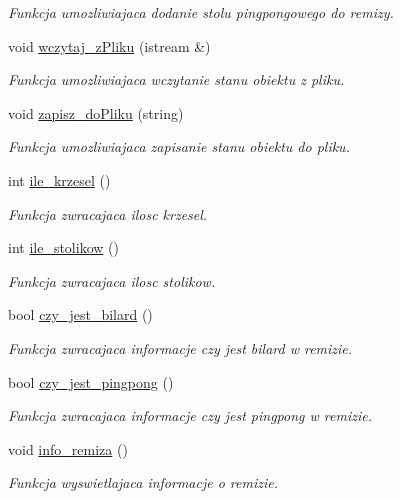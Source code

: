 \begin{DoxyCompactItemize}
\begin{DoxyCompactList}\small\item\em Funkcja umozliwiajaca dodanie stolu pingpongowego do remizy. \end{DoxyCompactList}\item 
\hypertarget{class_remiza_a783c6296060a050b61935787794d027c}{}void \hyperlink{class_remiza_a783c6296060a050b61935787794d027c}{wczytaj\+\_\+z\+Pliku} (istream \&)\label{class_remiza_a783c6296060a050b61935787794d027c}

\begin{DoxyCompactList}\small\item\em Funkcja umozliwiajaca wczytanie stanu obiektu z pliku. \end{DoxyCompactList}\item 
\hypertarget{class_remiza_a4c2563c5bde280b2232a555f45f79b3b}{}void \hyperlink{class_remiza_a4c2563c5bde280b2232a555f45f79b3b}{zapisz\+\_\+do\+Pliku} (string)\label{class_remiza_a4c2563c5bde280b2232a555f45f79b3b}

\begin{DoxyCompactList}\small\item\em Funkcja umozliwiajaca zapisanie stanu obiektu do pliku. \end{DoxyCompactList}\item 
int \hyperlink{class_remiza_ac7525b855d2ca06358f4f85eec6e712f}{ile\+\_\+krzesel} ()
\begin{DoxyCompactList}\small\item\em Funkcja zwracajaca ilosc krzesel. \end{DoxyCompactList}\item 
int \hyperlink{class_remiza_a58e9ad55b9a48892ab9d69e728d53e41}{ile\+\_\+stolikow} ()
\begin{DoxyCompactList}\small\item\em Funkcja zwracajaca ilosc stolikow. \end{DoxyCompactList}\item 
bool \hyperlink{class_remiza_a20b0ebdb1a93fd34a1b8d7c645d364b0}{czy\+\_\+jest\+\_\+bilard} ()
\begin{DoxyCompactList}\small\item\em Funkcja zwracajaca informacje czy jest bilard w remizie. \end{DoxyCompactList}\item 
bool \hyperlink{class_remiza_a19d23b5a0b58b717ceeaeb094d6214a2}{czy\+\_\+jest\+\_\+pingpong} ()
\begin{DoxyCompactList}\small\item\em Funkcja zwracajaca informacje czy jest pingpong w remizie. \end{DoxyCompactList}\item 
\hypertarget{class_remiza_acb8a536322f8998455c74c3c2abf4c38}{}void \hyperlink{class_remiza_acb8a536322f8998455c74c3c2abf4c38}{info\+\_\+remiza} ()\label{class_remiza_acb8a536322f8998455c74c3c2abf4c38}

\begin{DoxyCompactList}\small\item\em Funkcja wyswietlajaca informacje o remizie. \end{DoxyCompactList}\end{DoxyCompactItemize}
